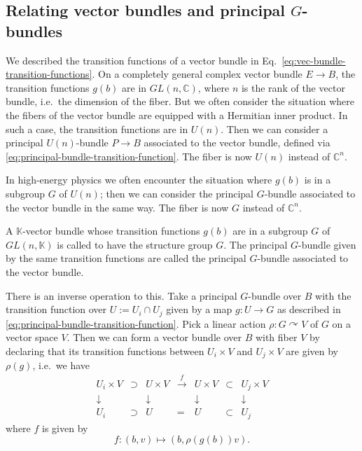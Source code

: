 \documentclass[12pt]{article}
\numberwithin{equation}{section}
\numberwithin{figure}{section}
\theoremstyle{remark}
\def\bC{\mathbb{C}}
\def\bK{\mathbb{K}}
\begin{document}
\subsection{Relating vector bundles and principal $G$-bundles}

We described the transition functions of a vector bundle in Eq.~\eqref{eq:vec-bundle-transition-functions}.
On a completely general complex vector bundle $E\to B$,
the transition functions $g (b)$ are in $GL(n,\bC)$,
where $n$ is the rank of the vector bundle, i.e.~the dimension of the fiber. 
But we often consider the situation where the fibers of the vector bundle are equipped with a Hermitian inner product.
In such a case, the transition functions are in $U(n)$.
Then we can consider a principal $U(n)$-bundle $P\to B$ associated to the vector bundle, 
defined via \eqref{eq:principal-bundle-transition-function}.
The fiber is now $U(n)$ instead of $\bC^n$.

In high-energy physics we often encounter the situation where $g (b)$ is in a subgroup $G$ of $U(n)$;
then we can consider the principal $G$-bundle associated to the vector bundle in the same way.
The fiber is now $G$ instead of $\bC^n$.

\begin{definition}
  A $\bK$-vector bundle whose transition functions $g(b)$ are in a subgroup $G$ of $GL(n,\bK)$
  is called to have the structure group $G$.
  The principal $G$-bundle given by the same transition functions are called 
  the  principal $G$-bundle associated to the vector bundle.
\end{definition}

There is an inverse operation to this.
Take a principal $G$-bundle over $B$
with the transition function over $U:=U_i\cap U_j$ given by
a map $g: U\to G$ as described in \eqref{eq:principal-bundle-transition-function}.
Pick a linear action $\rho: G \curvearrowright V$ of $G$ on a vector space $V$.
Then we can form a vector bundle over $B$ with fiber $V$
by declaring that its transition functions 
between $U_i\times V$ and $U_j\times V$
are given by $\rho(g)$, i.e.~we have
\begin{equation}
  \begin{array}{cccccccc}
    U_i \times V &\supset& U \times V & \xrightarrow{f } & 
    U \times V & \subset & U_j\times V \\
    \downarrow & & \downarrow & & \downarrow & & \downarrow \\
    U_i & \supset & U  & = & U  & \subset & U_j
  \end{array}
\end{equation}
where $f $ is given by \begin{equation}
   f : (b,v) \mapsto (b, \rho(g (b)) v).
\end{equation}
\end{document}

